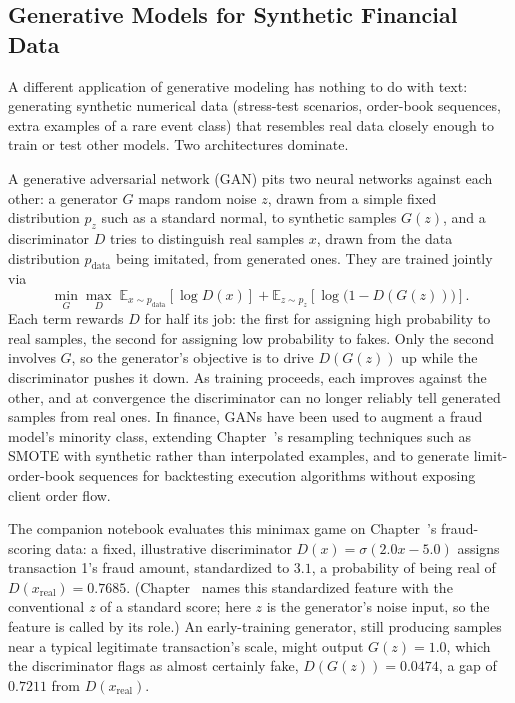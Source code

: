 \documentclass[../ai_in_finance]{subfiles}
\begin{document}
\subsection{Generative Models for Synthetic Financial Data}
\label{sec:generative-synthetic}

A different application of generative modeling has nothing to do with text: generating synthetic numerical data (stress-test scenarios, order-book sequences, extra examples of a rare event class) that resembles real data closely enough to train or test other models. Two architectures dominate.

A generative adversarial network (GAN) pits two neural networks against each other: a generator $G$ maps random noise $z$, drawn from a simple fixed distribution $p_z$ such as a standard normal, to synthetic samples $G(z)$, and a discriminator $D$ tries to distinguish real samples $x$, drawn from the data distribution $p_{\text{data}}$ being imitated, from generated ones. They are trained jointly via
\begin{equation}
\min_G \max_D \; \mathbb{E}_{x \sim p_{\text{data}}}\!\left[\log D(x)\right] + \mathbb{E}_{z \sim p_z}\!\left[\log\big(1 - D(G(z))\big)\right].
\label{eq:nlp-gan}
\end{equation}
Each term rewards $D$ for half its job: the first for assigning high probability to real samples, the second for assigning low probability to fakes. Only the second involves $G$, so the generator's objective is to drive $D(G(z))$ up while the discriminator pushes it down.
As training proceeds, each improves against the other, and at convergence the discriminator can no longer reliably tell generated samples from real ones. In finance, GANs have been used to augment a fraud model's minority class, extending Chapter~'s resampling techniques such as SMOTE with synthetic rather than interpolated examples, and to generate limit-order-book sequences for backtesting execution algorithms without exposing client order flow.

The companion notebook evaluates this minimax game on Chapter~'s fraud-scoring data: a fixed, illustrative discriminator $D(x) = \sigma(2.0x - 5.0)$ assigns transaction 1's fraud amount, standardized to $3.1$, a probability of being real of $D(x_{\text{real}}) = 0.7685$. (Chapter~ names this standardized feature with the conventional $z$ of a standard score; here $z$ is the generator's noise input, so the feature is called by its role.) An early-training generator, still producing samples near a typical legitimate transaction's scale, might output $G(z) = 1.0$, which the discriminator flags as almost certainly fake, $D(G(z)) = 0.0474$, a gap of $0.7211$ from $D(x_{\text{real}})$.
\end{document}
